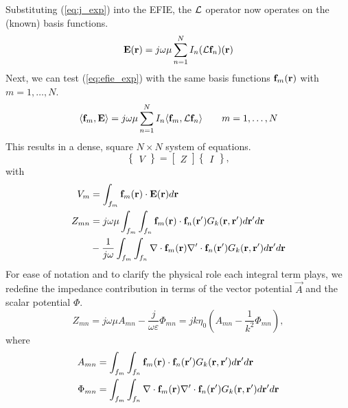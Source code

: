 Substituting (\ref{eq:j_exp}) into the EFIE, the $\mathcal{L}$ operator now operates on the (known) basis functions.
\begin{equation}
	\mathbf{E}(\mathbf{r}) = j\omega\mu \sum_{n = 1}^{N} I_n (\mathcal{L} \mathbf{f}_n)(\mathbf{r})
	\label{eq:efie_exp}
\end{equation}
Next, we can test (\ref{eq:efie_exp}) with the same basis functions $\mathbf{f}_m(\mathbf{r})$ with $m = 1, \dots, N$.
\begin{equation}
	\langle \mathbf{f}_m, \mathbf{E} \rangle = j\omega\mu \sum_{n = 1}^{N} I_n \langle \mathbf{f}_m, \mathcal{L} \mathbf{f}_n \rangle \qquad m = 1, \dots, N
\end{equation}
This results in a dense, square $N \times N$ system of equations.
\begin{equation}
	\begin{Bmatrix}
		V
	\end{Bmatrix} = \begin{bmatrix}
		Z
	\end{bmatrix} \begin{Bmatrix}
		I
	\end{Bmatrix},
\end{equation}
with
\begin{align*}
	V_m & = \int_{f_m} \mathbf{f}_m(\mathbf{r}) \cdot \mathbf{E}(\mathbf{r}) d\mathbf{r} \\
	Z_{mn} & = j\omega\mu \int_{f_m} \int_{f_n} \mathbf{f}_m(\mathbf{r}) \cdot \mathbf{f}_n(\mathbf{r}^\prime) G_k(\mathbf{r}, \mathbf{r}^\prime) d\mathbf{r}^\prime d\mathbf{r} \\
	 & - \frac{1}{j\omega} \int_{f_m} \int_{f_n} \nabla \cdot \mathbf{f}_m(\mathbf{r}) \nabla^\prime \cdot \mathbf{f}_n(\mathbf{r}^\prime) G_k(\mathbf{r}, \mathbf{r}^\prime) d\mathbf{r}^\prime d\mathbf{r}
\end{align*}
For ease of notation and to clarify the physical role each integral term plays, we redefine the impedance contribution in terms of the vector potential $\vec{A}$ and the scalar potential $\Phi$.
\begin{equation}
	Z_{mn} = j\omega\mu A_{mn} - \frac{j}{\omega\varepsilon} \Phi_{mn} = j k \eta_0 \left(A_{mn} - \frac{1}{k^2} \Phi_{mn} \right),
\end{equation}
where
\begin{align}
	A_{mn} & = \int_{f_m} \int_{f_n} \mathbf{f}_m(\mathbf{r}) \cdot \mathbf{f}_n(\mathbf{r}^\prime) G_k(\mathbf{r}, \mathbf{r}^\prime) d\mathbf{r}^\prime d\mathbf{r} \label{eq:Amn} \\
	\Phi_{mn} & = \int_{f_m} \int_{f_n} \nabla \cdot \mathbf{f}_m(\mathbf{r}) \nabla^\prime \cdot \mathbf{f}_n(\mathbf{r}^\prime) G_k(\mathbf{r}, \mathbf{r}^\prime) d\mathbf{r}^\prime d\mathbf{r} \label{eq:Pmn}
\end{align}

